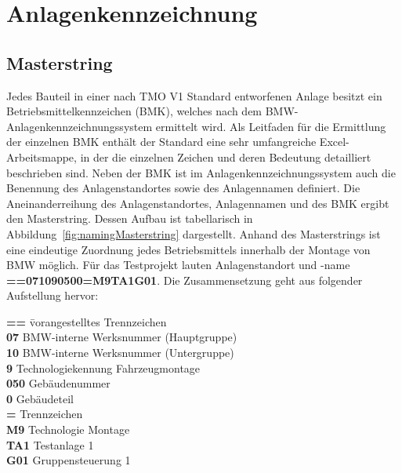 


\section{Anlagenkennzeichnung}
\label{sec:naming}

\subsection*{Masterstring}
\label{subsec:masterstring}




Jedes Bauteil in einer nach TMO V1 Standard entworfenen Anlage besitzt ein Betriebsmittelkennzeichen (BMK), welches nach dem BMW-Anlagenkennzeichnungssystem ermittelt wird. Als Leitfaden für die Ermittlung der einzelnen BMK enthält der Standard eine sehr umfangreiche Excel-Arbeitsmappe, in der die einzelnen Zeichen und deren Bedeutung detailliert beschrieben sind.
Neben der BMK ist im Anlagenkennzeichnungssystem auch die Benennung des Anlagenstandortes sowie des Anlagennamen definiert. Die Aneinanderreihung des Anlagenstandortes, Anlagennamen und des BMK ergibt den Masterstring. Dessen Aufbau ist tabellarisch in Abbildung~\ref{fig:namingMasterstring} dargestellt. Anhand des Masterstrings ist eine eindeutige Zuordnung jedes Betriebsmittels innerhalb der Montage von BMW möglich.
Für das Testprojekt lauten Anlagenstandort und -name \textbf{==071090500=M9TA1G01}. Die Zusammensetzung geht aus folgender Aufstellung hervor:

\begin{tabbing}
  \textbf{==\hspace{0.5cm}} \= vorangestelltes Trennzeichen \\
  \textbf{07} \> BMW-interne Werksnummer (Hauptgruppe) \\
  \textbf{10} \> BMW-interne Werksnummer (Untergruppe) \\
  \textbf{9} \> Technologiekennung Fahrzeugmontage \\
  \textbf{050} \> Gebäudenummer \\
  \textbf{0} \> Gebäudeteil \\
  \textbf{=} \> Trennzeichen \\
  \textbf{M9} \> Technologie Montage \\
  \textbf{TA1} \> Testanlage 1 \\
  \textbf{G01} \> Gruppensteuerung 1
\end{tabbing}

